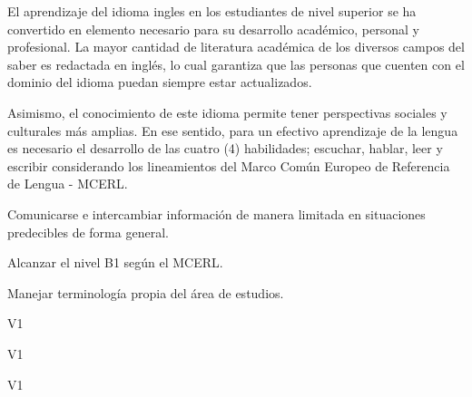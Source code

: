 \begin{syllabus}


\begin{justification}
El aprendizaje del idioma ingles en los estudiantes de nivel superior 
se ha convertido en elemento necesario para su desarrollo académico, personal y 
profesional. La mayor cantidad de literatura académica de los diversos campos 
del saber es redactada en inglés, lo cual garantiza que las personas que 
cuenten con el dominio del idioma puedan siempre estar actualizados. 

Asimismo, el conocimiento de este idioma permite tener perspectivas sociales y 
culturales más amplias. En ese sentido, para un efectivo aprendizaje de la 
lengua es necesario el desarrollo de las cuatro (4) habilidades; escuchar, 
hablar, leer y escribir considerando los lineamientos del 
Marco Común Europeo de Referencia de Lengua - MCERL.
\end{justification}

\begin{goals}
\item Comunicarse e intercambiar información de manera limitada en situaciones predecibles de forma general.
\item Alcanzar el nivel B1 según el MCERL.
\item Manejar terminología propia del área de estudios.
\end{goals}

\begin{outcomes}{V1}
\item {}
\end{outcomes}

\begin{specificoutcomes}{V1}
\item {}
\item {}
\item {}
\item {}
\end{specificoutcomes}

\begin{competences}{V1}
\item {}
\end{competences}


\end{syllabus}
